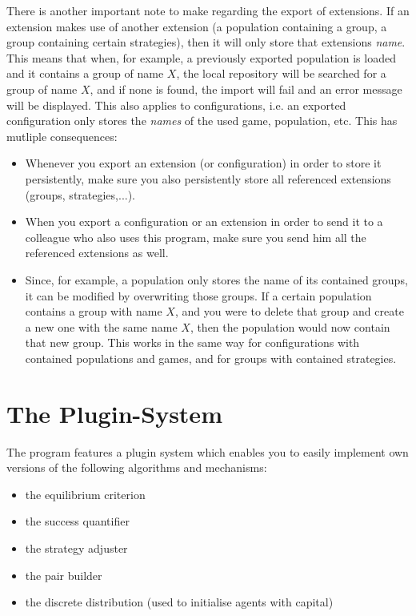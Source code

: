 \documentclass[parskip=full,11pt]{scrartcl}
\begin{document}
There is another important note to make regarding the export of extensions. If an extension makes use of another extension (a population containing a group, a group containing certain strategies), then it will only store that extensions \textit{name}. This means that when, for example, a previously exported population is loaded and it contains a group of name \(X\), the local repository will be searched for a group of name \(X\), and if none is found, the import will fail and an error message will be displayed. This also applies to configurations, i.e. an exported configuration only stores the \textit{names} of the used game, population, etc. This has mutliple consequences:
\begin{itemize}
\item Whenever you export an extension (or configuration) in order to store it persistently, make sure you also persistently store all referenced extensions (groups, strategies,...).
\item When you export a configuration or an extension in order to send it to a colleague who also uses this program, make sure you send him all the referenced extensions as well.
\item Since, for example, a population only stores the name of its contained groups, it can be modified by overwriting those groups. If a certain population contains a group with name \(X\), and you were to delete that group and create a new one with the same name \(X\), then the population would now contain that new group. This works in the same way for configurations with contained populations and games, and for groups with contained strategies.
\end{itemize}

\pagebreak
\section{The Plugin-System}

The program features a plugin system which enables you to easily implement own versions of the following algorithms and mechanisms:

\begin{itemize} \itemsep -13pt
	\item the equilibrium criterion
	\item the success quantifier
	\item the strategy adjuster
	\item the pair builder
	\item the discrete distribution (used to initialise agents with capital)
\end{itemize}
\end{document}

